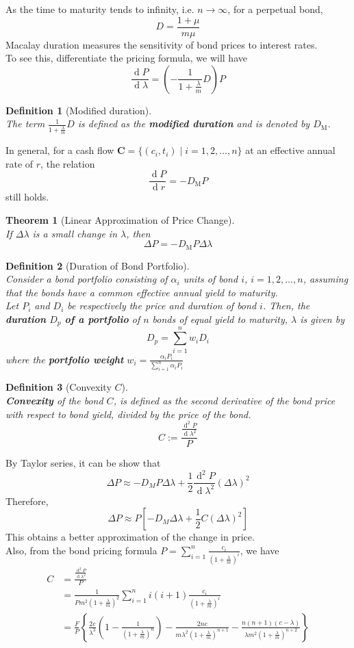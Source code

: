 \documentclass[12pt]{article}
\newtheorem{definition}{Definition}[section]
\newtheorem{theorem}{Theorem}[section]
\theoremstyle{definition}
\DeclareMathOperator{\diff}{d}
\newcommand\cf[1]{\mathbf{#1}}
\begin{document}
As the time to maturity tends to infinity, i.e. $n\to\infty$, for a perpetual bond,
\[
D=\frac{1+\mu}{m\mu}
\]
Macalay duration measures the sensitivity of bond prices to interest rates.\\
To see this, differentiate the pricing formula, we will have
\[
\frac{\diff P}{\diff \lambda}=\left(-\frac{1}{1+\frac{\lambda}{m}}D\right)P
\]
\begin{definition}[Modified duration]
\hfill\\\normalfont The term $\frac{1}{1+\frac{\lambda}{m}}D$ is defined as the \textbf{modified duration} and is denoted by $D_\text{M}$.
\end{definition}
In general, for a cash flow $\cf{C}=\{(c_i, t_i)\mid i = 1, 2,\ldots, n\}$ at an effective annual rate of $r$, the relation 
\[
\frac{\diff P}{\diff r} = -D_\text{M}P
\]
still holds.
\begin{theorem}[Linear Approximation of Price Change]
\hfill\\\normalfont If $\Delta\lambda$ is a small change in $\lambda$, then
\[
\Delta P = -D_\text{M}P\Delta\lambda
\]
\end{theorem}
\begin{definition}[Duration of Bond Portfolio]
\hfill\\\normalfont Consider a bond portfolio consisting of $\alpha_i$ units of bond $i$, $i = 1, 2, \ldots, n$, assuming that the bonds have a \textit{common} effective annual yield to maturity.\\
Let $P_i$ and $D_i$ be respectively the price and duration of bond $i$. Then, the \textbf{duration} $D_p$ \textbf{of a portfolio} of $n$ bonds of equal yield to maturity, $\lambda$ is given by
\[
D_p = \sum_{i=1}^nw_iD_i
\]
where the \textbf{portfolio weight} $w_i = \frac{\alpha_i P_i}{\sum_{i=1}^n\alpha_i P_i}$
\end{definition}
\begin{definition}[Convexity $C$]
\hfill\\\normalfont \textbf{Convexity} of the bond $C$, is defined as the second derivative of the bond price with respect to bond yield, divided by the price of the bond.
\[
C:=\frac{\frac{\diff^2 P}{\diff \lambda^2}}{P}
\]
\end{definition}
By Taylor series, it can be show that
\[
\Delta P \approx -D_MP\Delta\lambda+\frac{1}{2}\frac{\diff^2 P}{\diff \lambda^2}(\Delta \lambda)^2
\]
Therefore,
\[
\Delta P \approx P\left[-D_M\Delta\lambda + \frac{1}{2}C(\Delta\lambda)^2\right]
\]
This obtains a better approximation of the change in price.\\
Also, from the bond pricing formula $P=\sum_{i=1}^n\frac{c_i}{\left(1+\frac{\lambda}{m}\right)^i}$, we have
\begin{align*}
C&=\frac{\frac{\diff^2 P}{\diff \lambda^2}}{P} \\
&=\frac{1}{Pm^2\left(1+\frac{\lambda}{m}\right)^2}\sum_{i=1}^n i(i+1)\frac{c_i}{\left(1+\frac{\lambda}{m}\right)^i}\\
&=\frac{F}{P}\left\{\frac{2c}{\lambda^3}\left(1-\frac{1}{\left(1+\frac{\lambda}{m}\right)^n}\right)-\frac{2nc}{m\lambda^2\left(1+\frac{\lambda}{m}\right)^{n+1}}-\frac{n(n+1)(c-\lambda)}{\lambda m^2\left(1+\frac{\lambda}{m}\right)^{n+2}}\right\}
\end{align*}
\end{document}
